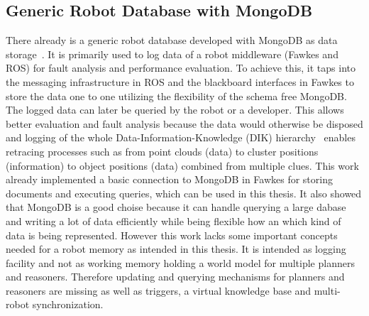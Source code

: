 \documentclass[a4paper,11pt]{article}
\begin{document}
\subsection{Generic Robot Database with MongoDB}
\label{sec:mongo-logging}
There already is a generic robot database developed with MongoDB as
data storage~\cite{RoboDB}. It is primarily used to log data of a
robot middleware (Fawkes and ROS) for fault analysis and performance
evaluation. To achieve this, it taps into the messaging infrastructure
in ROS and the blackboard interfaces in Fawkes to store the data one
to one utilizing the flexibility of the schema free MongoDB. The
logged data can later be queried by the robot or a developer. This
allows better evaluation and fault analysis because the data would
otherwise be disposed and logging of the whole
Data-Information-Knowledge (DIK) hierarchy~\cite{DIKW} enables
retracing processes such as from point clouds (data) to cluster
positions (information) to object positions (data) combined from
multiple clues. This work already implemented a basic connection to
MongoDB in Fawkes for storing documents and executing queries, which
can be used in this thesis. It also showed that MongoDB is a good
choise because it can handle querying a large dabase and writing a lot
of data efficiently while being flexible how an which kind of data is
being represented.  However this work lacks some important concepts
needed for a robot memory as intended in this thesis. It is intended
as logging facility and not as working memory holding a world model
for multiple planners and reasoners. Therefore updating and querying
mechanisms for planners and reasoners are missing as well as triggers,
a virtual knowledge base and multi-robot synchronization.
\end{document}
